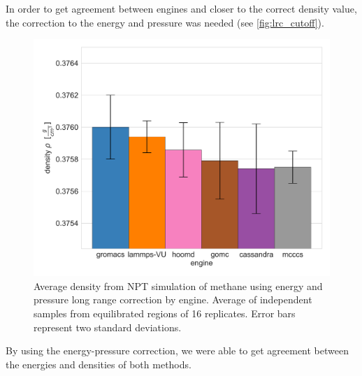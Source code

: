 In order to get agreement between engines and closer to the correct density value, the correction to the energy and pressure was needed (see \autoref{fig:lrc_cutoff}).
\begin{figure}[h!]
    \centering
    \includegraphics[width=0.8\linewidth,keepaspectratio]{figures/rep_study/lrc_cutoff.png}
    \caption{Average density from NPT simulation of methane using energy and pressure long range correction by engine. Average of independent samples from equilibrated regions of 16 replicates. Error bars represent two standard deviations.}\label{fig:lrc_cutoff}
\end{figure}
By using the energy-pressure correction, we were able to get agreement between the energies and densities of both methods. 

